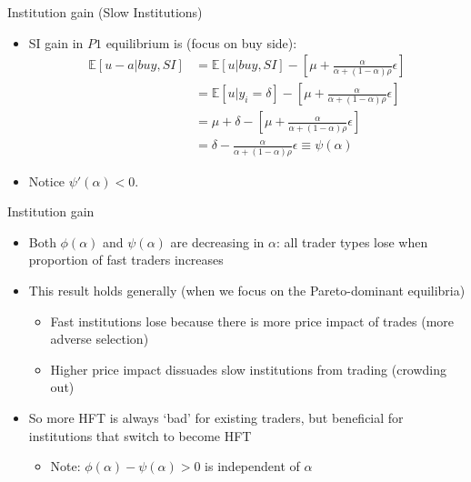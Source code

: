 \documentclass[english,10pt
,aspectratio=169
]{beamer}
\begin{document}
\begin{frame}{Institution gain (Slow Institutions)}
	\begin{itemize}
		\item SI gain in $P1$ equilibrium is (focus on buy side):
		\begin{align*}
		\mathbb{E}[u-a|buy, SI]
		& = \mathbb{E}[u|buy, SI] - \left[\mu + \frac{\alpha}{\alpha+(1-\alpha)\rho} \epsilon\right] \\
		& = \mathbb{E}[u|y_{i}=\delta] - \left[\mu + \frac{\alpha}{\alpha+(1-\alpha)\rho} \epsilon\right] \\
		& = \mu+\delta - \left[\mu + \frac{\alpha}{\alpha+(1-\alpha)\rho} \epsilon\right] \\
		& = \delta -  \frac{\alpha}{\alpha+(1-\alpha)\rho} \epsilon \equiv \psi(\alpha)
		\end{align*}
		\item Notice $\psi'(\alpha)<0$.
	\end{itemize}
\end{frame}


\begin{frame}{Institution gain}
	\begin{itemize}
		\item Both $\phi(\alpha)$ and $\psi(\alpha)$ are decreasing in $\alpha$: all trader types lose when proportion of fast traders increases
		\item This result holds generally (when we focus on the Pareto-dominant equilibria)
		\begin{itemize}
			\item Fast institutions lose because there is more price impact of trades (more adverse selection)
			\item Higher price impact dissuades slow institutions from trading 
			(crowding out)
		\end{itemize}
		\item So more HFT  is always `bad' for existing traders, but beneficial for institutions that switch to become HFT
		\begin{itemize}
			\item Note: $\phi(\alpha)-\psi(\alpha) > 0$ is independent of $\alpha$
		\end{itemize}
	\end{itemize}
\end{frame}
\end{document}
